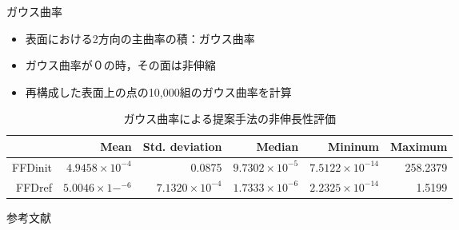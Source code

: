 \documentclass[dvipdfmx]{beamer}
\begin{document}
    \begin{frame}{ガウス曲率}
        \begin{itemize}
            \item 表面における2方向の主曲率の積：ガウス曲率
            \item ガウス曲率が０の時，その面は非伸縮
            \item 再構成した表面上の点の10,000組のガウス曲率を計算
        \end{itemize}
\begin{table}[htb]
  \caption{ガウス曲率による提案手法の非伸長性評価}
  \centering
  {\tiny
  \begin{tabular}{|r|r|r|r|r|r|} \hline
      & Mean & Std. deviation & Median & Mininum & Maximum \\ \hline
      FFDinit& $4.9458\times10^{-4}$ & 0.0875 & $9.7302\times10^{-5}$ & $7.5122\times10^{-14}$ & 258.2379 \\ \hline
      FFDref& $5.0046\times1-^{-6}$ & $7.1320\times10^{-4}$ & $1.7333\times10^{-6}$ & $2.2325\times10^{-14}$ & 1.5199 \\ \hline
  \end{tabular}
  }
  \label{table3}
\end{table}
    \end{frame}
  \begin{frame}{参考文献}
    
\end{frame}
\end{document}

